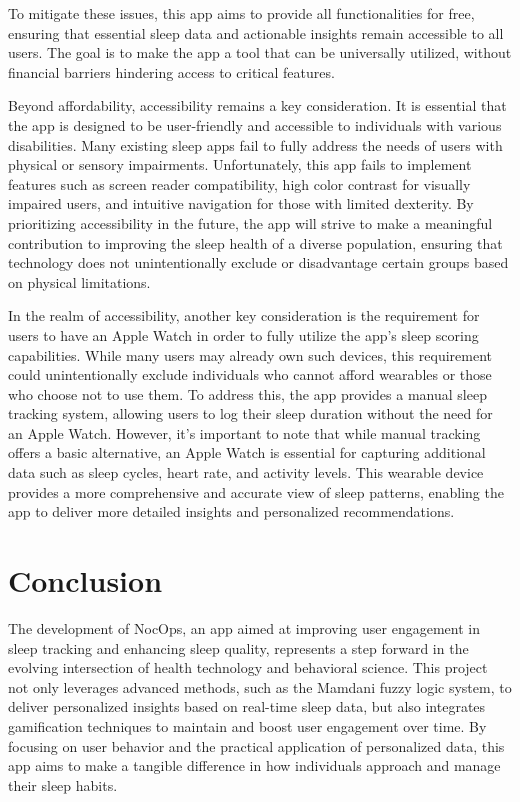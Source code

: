 \documentclass[10pt,twocolumn]{article}
\begin{document}
To mitigate these issues, this app aims to provide all functionalities for free, ensuring that essential sleep data and actionable insights remain accessible to all users. The goal is to make the app a tool that can be universally utilized, without financial barriers hindering access to critical features.

Beyond affordability, accessibility remains a key consideration. It is essential that the app is designed to be user-friendly and accessible to individuals with various disabilities. Many existing sleep apps fail to fully address the needs of users with physical or sensory impairments. Unfortunately, this app fails to implement features such as screen reader compatibility, high color contrast for visually impaired users, and intuitive navigation for those with limited dexterity. By prioritizing accessibility in the future, the app will strive to make a meaningful contribution to improving the sleep health of a diverse population, ensuring that technology does not unintentionally exclude or disadvantage certain groups based on physical limitations.

In the realm of accessibility, another key consideration is the requirement for users to have an Apple Watch in order to fully utilize the app's sleep scoring capabilities. While many users may already own such devices, this requirement could unintentionally exclude individuals who cannot afford wearables or those who choose not to use them. To address this, the app provides a manual sleep tracking system, allowing users to log their sleep duration without the need for an Apple Watch. However, it’s important to note that while manual tracking offers a basic alternative, an Apple Watch is essential for capturing additional data such as sleep cycles, heart rate, and activity levels. This wearable device provides a more comprehensive and accurate view of sleep patterns, enabling the app to deliver more detailed insights and personalized recommendations.

\section{Conclusion}

The development of NocOps, an app aimed at improving user engagement in sleep tracking and enhancing sleep quality, represents a step forward in the evolving intersection of health technology and behavioral science. This project not only leverages advanced methods, such as the Mamdani fuzzy logic system, to deliver personalized insights based on real-time sleep data, but also integrates gamification techniques to maintain and boost user engagement over time. By focusing on user behavior and the practical application of personalized data, this app aims to make a tangible difference in how individuals approach and manage their sleep habits.
\end{document}
